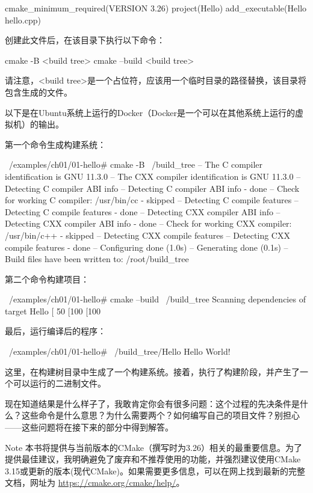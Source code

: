 \begin{cmake}
cmake_minimum_required(VERSION 3.26)
project(Hello)
add_executable(Hello hello.cpp)
\end{cmake}

创建此文件后，在该目录下执行以下命令：

\begin{shell}
cmake -B <build tree>
cmake --build <build tree>
\end{shell}

请注意，<build tree>是一个占位符，应该用一个临时目录的路径替换，该目录将包含生成的文件。

以下是在Ubuntu系统上运行的Docker（Docker是一个可以在其他系统上运行的虚拟机）的输出。

第一个命令生成构建系统：

\begin{shell}
~/examples/ch01/01-hello# cmake -B ~/build_tree
-- The C compiler identification is GNU 11.3.0
-- The CXX compiler identification is GNU 11.3.0
-- Detecting C compiler ABI info
-- Detecting C compiler ABI info - done
-- Check for working C compiler: /usr/bin/cc - skipped
-- Detecting C compile features
-- Detecting C compile features - done
-- Detecting CXX compiler ABI info
-- Detecting CXX compiler ABI info - done
-- Check for working CXX compiler: /usr/bin/c++ - skipped
-- Detecting CXX compile features
-- Detecting CXX compile features - done
-- Configuring done (1.0s)
-- Generating done (0.1s)
-- Build files have been written to: /root/build_tree
\end{shell}

第二个命令构建项目：

\begin{shell}
~/examples/ch01/01-hello# cmake --build ~/build_tree
Scanning dependencies of target Hello
[ 50%
[100%
[100%
\end{shell}

最后，运行编译后的程序：

\begin{shell}
~/examples/ch01/01-hello# ~/build_tree/Hello
Hello World!
\end{shell}

这里，在构建树目录中生成了一个构建系统。接着，执行了构建阶段，并产生了一个可以运行的二进制文件。

现在知道结果是什么样子了，我敢肯定你会有很多问题：这个过程的先决条件是什么？这些命令是什么意思？为什么需要两个？如何编写自己的项目文件？别担心——这些问题将在接下来的部分中得到解答。

\begin{myNotic}{Note}
本书将提供与当前版本的CMake（撰写时为3.26）相关的最重要信息。为了提供最佳建议，我明确避免了废弃和不推荐使用的功能，并强烈建议使用CMake 3.15或更新的版本(现代CMake)。如果需要更多信息，可以在网上找到最新的完整文档，网址为 \url{https://cmake.org/cmake/help/}。
\end{myNotic}
















